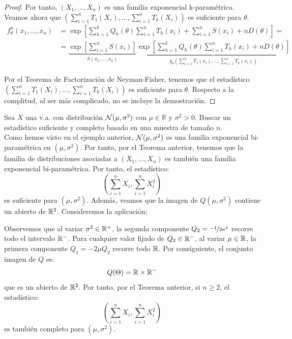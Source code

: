 \begin{teo}
\begin{proof}
        Por tanto, $(X_1, \ldots, X_n)$ es una familia exponencial k-paramétrica. Veamos ahora que $\left(\sum\limits_{i=1}^n T_1(X_i), \ldots, \sum\limits_{i=1}^n T_k(X_i)\right)$ es suficiente para $\theta$.
        \begin{align*}
            f_\theta^n(x_1, \ldots, x_n) &= \exp\left[\sum\limits_{h=1}^k Q_h(\theta) \sum\limits_{i=1}^n T_h(x_i) + \sum\limits_{i=1}^n S(x_i) + n D(\theta)\right] =\\&= \underbrace{\exp\left[\sum\limits_{i=1}^n S(x_i)\right]}_{h(x_1, \ldots, x_n)} \underbrace{\exp\left[\sum\limits_{h=1}^k Q_h(\theta) \sum\limits_{i=1}^n T_h(x_i) + n D(\theta)\right]}_{g_\theta\left(\sum\limits_{i=1}^n T_1(x_i), \ldots, \sum\limits_{i=1}^n T_k(x_i)\right)}
        \end{align*}
        
        Por el Teorema de Factorización de Neyman-Fisher, tenemos que el estadístico $\left(\sum\limits_{i=1}^n T_1(X_i), \ldots, \sum\limits_{i=1}^n T_k(X_i)\right)$ es suficiente para $\theta$. Respecto a la complitud, al ser más complicado, no se incluye la demostración.
    \end{proof}
\end{teo}

\begin{ejemplo}
    Sea $X$ una v.a. con distribución $\mathcal{N}(\mu, \sigma^2)$ con $\mu \in \mathbb{R}$ y $\sigma^2 > 0$. Buscar un estadístico suficiente y completo basado en una muestra de tamaño $n$.\\

    Como hemos visto en el ejemplo anterior, $\mathcal{N}(\mu, \sigma^2)$ es una familia exponencial bi-paramétrica en $(\mu, \sigma^2)$. Por tanto, por el Teorema anterior, tenemos que la familia de distribuciones asociadas a $(X_1, \ldots, X_n)$ es también una familia exponencial bi-paramétrica. Por tanto, el estadístico:
    \begin{equation*}
        \left(\sum\limits_{i=1}^n X_i, \sum\limits_{i=1}^n X_i^2\right)
    \end{equation*}
    es suficiente para $(\mu, \sigma^2)$. Además, veamos que la imagen de $Q(\mu, \sigma^2)$ contiene un abierto de $\mathbb{R}^2$. Consideremos la aplicación:

    Observemos que al variar $\sigma^2 \in \mathbb{R}^+$, la segunda componente $Q_2 = \nicefrac{-1}{2\sigma^2}$ recorre todo el intervalo $\mathbb{R}^-$. Para cualquier valor fijado de $Q_2 \in \mathbb{R}^-$, al variar $\mu \in \mathbb{R}$, la primera componente $Q_1 = -2\mu Q_2$ recorre todo $\mathbb{R}$. Por consiguiente, el conjunto imagen de $Q$ es:
    \begin{equation*}
        Q(\Theta) = \mathbb{R} \times \mathbb{R}^-
    \end{equation*}
    que es un abierto de $\mathbb{R}^2$. Por tanto, por el Teorema anterior, si $n \geq 2$, el estadístico:
    \begin{equation*}
        \left(\sum_{i=1}^n X_i, \sum_{i=1}^n X_i^2\right)
    \end{equation*}
    es también completo para $(\mu, \sigma^2)$.
\end{ejemplo}